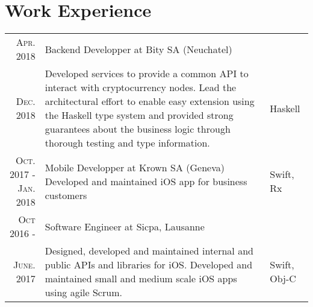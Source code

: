 \documentclass[a4paper,10pt]{article} %
\begin{document}
\section{Work Experience}
\renewcommand{\arraystretch}{1.3}
\begin{tabular}{r|p{9.3cm}|l}
\textsc{Apr. 2018} & Backend Developper at Bity SA (Neuchatel) & \\
\textsc{Dec. 2018} & \footnotesize{Developed services to provide a common API to interact with cryptocurrency nodes. Lead the architectural effort to enable easy extension using the Haskell type system and provided strong guarantees about the business logic through thorough testing and type information.} & Haskell\\

\makecell[cr]{
	\textsc{Oct. 2017 -} \\
	\textsc{Jan. 2018}
	} & \makecell[cl]{Mobile Developper at Krown SA (Geneva)\\
	    \footnotesize{Developed and maintained iOS app for business customers}}& Swift, Rx\\

\textsc{Oct 2016 -} & Software Engineer at Sicpa, Lausanne\\

\textsc{June. 2017}  
& \footnotesize{Designed, developed and maintained internal and public APIs and libraries for iOS. Developed and maintained small and medium scale iOS apps using agile Scrum.} 
& Swift, Obj-C\\

\end{tabular}

\end{document}
